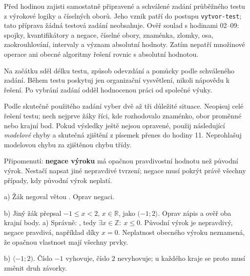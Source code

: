 \documentclass[11pt,a4paper]{article}
\begin{document}
Před hodinou zajisti samostatně připravené a schválené zadání průběžného
testu z výrokové logiky a číselných oborů. Jeho vznik patří do postupu
\texttt{vytvor-test}; tato příprava žádná testová zadání neobsahuje.
Ověř soulad s hodinami 02–09: spojky, kvantifikátory a negace,
číselné obory, znaménka, zlomky, osa, zaokrouhlování, intervaly a význam
absolutní hodnoty. Zatím nepatří množinové operace ani obecné algoritmy
řešení rovnic s absolutní hodnotou.


Na začátku sděl délku testu, způsob odevzdání a pomůcky podle schváleného
zadání. Během testu poskytuj jen organizační vysvětlení, nikoli nápovědu
k řešení. Po vybrání zadání odděl hodnocenou práci od společné výuky.

Podle skutečně použitého zadání vyber dvě až tři důležité situace.
Neopisuj celé řešení testu; nech nejprve žáky říci, kde rozhodovalo
znaménko, obor proměnné nebo krajní bod. Pokud výsledky ještě nejsou
opravené, použij následující \emph{modelové} chyby a skutečná zjištění
z písemek přenes do hodiny 11. Neprohlašuj modelovou chybu za zjištěnou chybu třídy.

\begin{definiceBox}[title={Definice - Negace výroku}]
Připomenutí: \textbf{negace výroku} má opačnou pravdivostní hodnotu
než původní výrok. Nestačí napsat jiné nepravdivé tvrzení;
negace musí pokrýt právě všechny případy, kdy původní výrok neplatí.
\end{definiceBox}

\begin{prikladReseniBox}[title={Příklad 1},breakable=false]
a) Žák negoval  větou
. Oprav negaci.

b) Jiný žák přepsal $-1\le x<2$, $x\in\mathbb R$, jako $(-1;2\rangle$.
Oprav zápis a ověř oba krajní body.
\tcblower
a) Správně: , tedy
$\exists x\in\mathbb Z:\ x\le0$. Původní výrok je nepravdivý,
negace pravdivá, například díky $x=0$. Neplatnost obecného výroku
neznamená, že opačnou vlastnost mají všechny prvky.

b) $\langle-1;2)$. Číslo $-1$ vyhovuje, číslo $2$ nevyhovuje;
u každého kraje se proto musí změnit druh závorky.
\end{prikladReseniBox}
\end{document}
